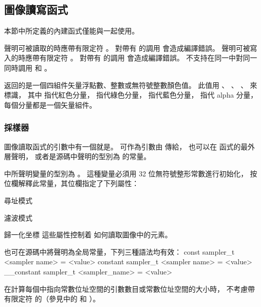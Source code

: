 \subsection[sec:imgRwFunc]{圖像讀寫函式}

本節中所定義的內建函式僅能與一起使用。

聲明可被讀取的時應帶有限定符 。
對帶有  的調用  會造成編譯錯誤。
聲明可被寫入的時應帶有限定符 。
對帶有  的調用  會造成編譯錯誤。
不支持在同一中對同一
同時調用  和 。

 返回的是一個四組件矢量浮點數、整數或無符號整數顏色值。
此值用 、 、 、  來標識，
其中  指代紅色分量，  指代綠色分量，  指代藍色分量，
  指代 alpha 分量，每個分量都是一個矢量組件。

\subsubsection[sec:samplerInImgRw]{採樣器}

圖像讀取函式的引數中有一個就是。
可作為引數由  傳給，
也可以在  函式的最外層聲明，
或者是源碼中聲明的型別為  的常量。

中所聲明變量的型別為 。
這種變量必須用 32 位無符號整形常數進行初始化，
按位欄解釋此常量，其位欄指定了下列屬性：
\startigBase[indentnext=no]
\item 尋址模式
\item 濾波模式
\item 歸一化坐標
\stopigBase
這些屬性控制着  如何讀取圖像中的元素。

也可在源碼中將聲明為全局常量，下列三種語法均有效：
\startclc
const sampler_t		<sampler name> = <value>
constant sampler_t	<sampler name> = <value>
__constant sampler_t	<sampler_name> = <value>
\stopclc

\startnotepar
在計算每個中指向常數位址空間的引數數目或常數位址空間的大小時，
不考慮帶有限定符  的（參見中的
  和
 ）。
\stopnotepar

